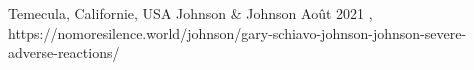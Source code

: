           {Temecula, Californie, USA}
          {}
          {Johnson \& Johnson}
          {Août 2021}
          {
            ,
          }
          {https://nomoresilence.world/johnson/gary-schiavo-johnson-johnson-severe-adverse-reactions/}

